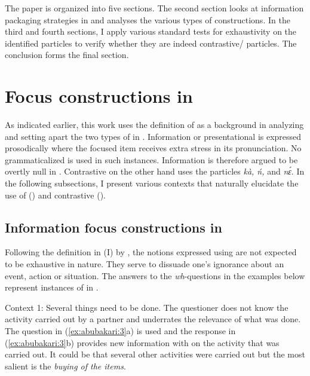 \documentclass[output=paper,modfonts,nonflat,
 hidelinks
]{langsci/langscibook}
\begin{document}
The paper is organized into five sections. The second section looks at information packaging strategies in  and analyses the various types of  constructions. In the third and fourth sections, I apply various standard tests for exhaustivity on the identified  particles to verify whether they are indeed contrastive{\slash} particles. The conclusion forms the final section.

\section{Focus constructions in }

As indicated earlier, this work uses the definition of \citet{ÉKiss1998} as a background in analyzing and setting apart the two types of  in . Information or presentational  is expressed prosodically where the focused item receives extra stress in its pronunciation. No grammaticalized  is used in such instances. Information  is therefore argued to be overtly null in . Contrastive  on the other hand uses the particles \textit{kà, ń,} and \textit{nɛ́}. In the following subsections, I present various contexts that naturally elucidate the use of  () and contrastive  ().

\subsection{Information focus constructions in }\label{sec:abubakari:2.1}

Following the definition in (I) by \citet[246]{ÉKiss1998}, the notions expressed using  are not expected to be exhaustive in nature. They serve to dissuade one’s ignorance about an event, action or situation. The answers to the \textit{wh}{}-questions in the examples below represent instances of  in . 

Context 1: Several things need to be done. The questioner does not know the activity carried out by a partner and underrates the relevance of what was done. The question in (\ref{ex:abubakari:3}a) is used and the response in (\ref{ex:abubakari:3}b) provides new information with  on the activity that was carried out. It could be that several other activities were carried out but the most salient is the \textit{buying of the items}.
 
\end{document}
